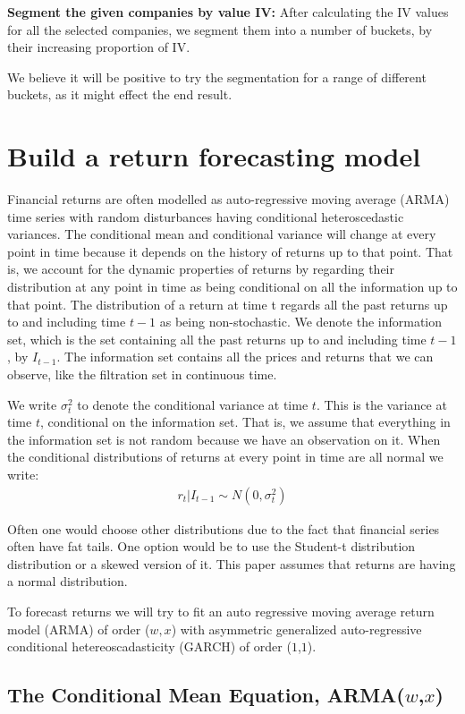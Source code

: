 \textbf{Segment the given companies by value IV:} After calculating the IV values for all the selected companies, we segment them into a number of buckets, by their increasing proportion of IV. 

We believe it will be positive to try the segmentation for a range of different buckets, as it might effect the end result.

\section*{Build a return forecasting model} 

Financial returns are often modelled as auto-regressive moving average (ARMA) time series with random disturbances having conditional heteroscedastic variances. The conditional mean and conditional variance will change at every point in time because it depends on the history of returns up to that point. That is, we account for the dynamic properties of returns by regarding their distribution at any point in time as being conditional on all the information up to that point. The distribution of a return at time t regards all the past returns up to and including time $t-1$ as being non-stochastic. We denote the information set, which is the set containing all the past returns up to and including time $t-1$, by $I_{t-1}$. The information set contains all the prices and returns that we can observe, like the filtration set in continuous time. 

We write $\sigma_t^2$ to denote the conditional variance at time $t$. This is the variance at time $t$, conditional on the information set. That is, we assume that everything in the information set is not random because we have an observation on it. When the conditional distributions of returns at every point in time are all normal we write:
\begin{align}
    r_t | I_{t-1} \sim N(0,{\sigma_t^2})
\end{align}

Often one would choose other distributions due to the fact that financial
series often have fat tails. One option would be to use the Student-t
distribution distribution or a skewed version of it. This paper assumes that returns are having a normal distribution. 

To forecast returns we will try to fit an auto regressive moving average return model (ARMA) of order ($w,x$) with asymmetric generalized auto-regressive conditional hetereoscadasticity (GARCH) of order ($1$,$1$).
\subsection*{The Conditional Mean Equation, ARMA($w$,$x$)}

